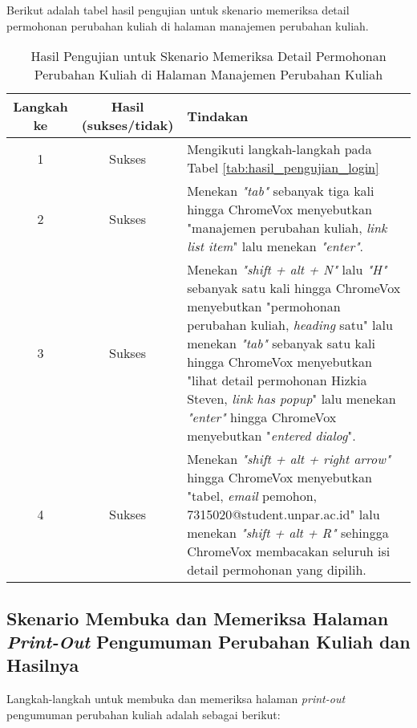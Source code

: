 Berikut adalah tabel hasil pengujian untuk skenario memeriksa detail permohonan perubahan kuliah di halaman manajemen perubahan kuliah.

\begin{table}[H]
    \centering 
    \caption{Hasil Pengujian untuk Skenario Memeriksa Detail Permohonan Perubahan Kuliah di Halaman Manajemen Perubahan Kuliah}
    \label{tab:hasil_pengujian_memeriksa_detail_permohonan_perubahan_kuliah_di_halaman_manajemen_perubahan_kuliah}
    \begin{tabular}{|c|c|p{10cm}|}
        \toprule
        Langkah ke & Hasil (sukses/tidak) & Tindakan \\

        \midrule
        1 & Sukses & Mengikuti langkah-langkah pada Tabel \ref{tab:hasil_pengujian_login} \\
        2 & Sukses & Menekan \textit{"tab"} sebanyak tiga kali hingga ChromeVox menyebutkan "manajemen perubahan kuliah, \textit{link list item}" lalu menekan \textit{"enter"}. \\
        3 & Sukses & Menekan \textit{"shift + alt + N"} lalu \textit{"H"} sebanyak satu kali hingga ChromeVox menyebutkan "permohonan perubahan kuliah, \textit{heading} satu" lalu menekan \textit{"tab"} sebanyak satu kali hingga ChromeVox menyebutkan "lihat detail permohonan Hizkia Steven, \textit{link has popup}" lalu menekan \textit{"enter"} hingga ChromeVox menyebutkan "\textit{entered dialog}". \\
        4 & Sukses & Menekan \textit{"shift + alt + right arrow"} hingga ChromeVox menyebutkan "tabel, \textit{email} pemohon, 7315020@student.unpar.ac.id" lalu menekan \textit{"shift + alt + R"} sehingga ChromeVox membacakan seluruh isi detail permohonan yang dipilih. \\

        \bottomrule

    \end{tabular}
\end{table}

\subsection{Skenario Membuka dan Memeriksa Halaman \textit{Print-Out} Pengumuman Perubahan Kuliah dan Hasilnya}
\label{subsec:skenario_membuka_dan_memeriksa_halaman_print_out_pengumuman_perubahan_kuliah}
Langkah-langkah untuk membuka dan memeriksa halaman \textit{print-out} pengumuman perubahan kuliah adalah sebagai berikut:

